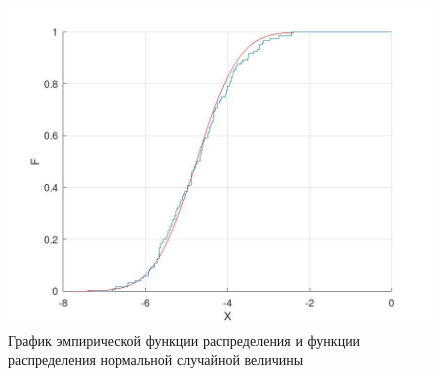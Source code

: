 \begin{figure}[ht!]
	\begin{center}
		\includegraphics[scale=0.4]{assets/cdf.jpg}
		\caption{График эмпирической функции распределения и функции распределения нормальной случайной величины}
	\end{center}
\end{figure}
